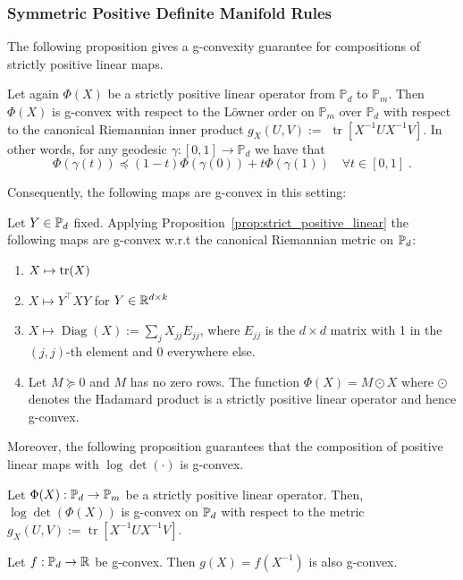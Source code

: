 \documentclass[twoside,11pt]{article}
\begin{document}
\subsubsection{Symmetric Positive Definite Manifold Rules}
The following proposition gives a g-convexity guarantee for compositions of strictly positive linear maps.
%
\begin{prop}\label{prop:strict_positive_linear}
    Let again $\Phi(X)$ be a strictly positive linear operator from $\mathbb{P}_d$ to $\mathbb{P}_m$. Then $\Phi(X)$ is g-convex with respect to the Löwner order on $\mathbb{P}_m$ over $\mathbb{P}_d$ with respect to the canonical Riemannian inner product $g_X(U, V):=$ $\operatorname{tr}\left[X^{-1} U X^{-1} V\right]$. In other words, for any geodesic $\gamma:[0,1] \rightarrow \mathbb{P}_d$ we have that
$$
\Phi(\gamma(t)) \preceq(1-t) \Phi(\gamma(0))+t \Phi(\gamma(1)) \quad \forall t \in[0,1] \; .
$$
\end{prop}
%
Consequently, the following maps are g-convex in this setting:
%
\begin{example}
    Let $Y \in \mathbb{P}_d$ fixed. Applying Proposition~\ref{prop:strict_positive_linear} the following maps are g-convex w.r.t the canonical Riemannian metric on $\mathbb{P}_d$:
    \begin{enumerate}
    \item $X \mapsto \text{tr}(X)$ 
    \item $X \mapsto Y^\top X Y$ for $Y \in \mathbb{R}^{d \times k}$
    \item $X \mapsto \operatorname{Diag}(X) := \sum_{j}X_{jj}E_{jj}$, where $E_{jj}$ is the $d\times d$ matrix with 1 in the $(j,j)$-th element and 0 everywhere else.
    \item Let $M \succeq 0$ and $M$ has no zero rows.  The function $\Phi(X) = M \odot X$ where $\odot$ denotes the Hadamard product is a strictly positive linear operator and hence g-convex.
    \end{enumerate}
\end{example}
%
Moreover, the following proposition guarantees that the composition of positive linear maps with $\log \det(\cdot)$ is g-convex.
%
\begin{prop}\label{prop:logdet_gcvx} Let $\Phi(X):\mathbb{P}_d \to \mathbb{P}_m$ be a strictly positive linear operator. Then, $\log \operatorname{det}(\Phi(X))$ is g-convex on $\mathbb{P}_d$ with respect to the metric $g_X(U, V):=\operatorname{tr}\left[X^{-1} U X^{-1} V\right]$.
\end{prop}
%
\begin{prop}\label{lemma:inverse_gcvx}
    Let $f: \mathbb{P}_d \to \mathbb{R}$ be g-convex.
    Then $g(X) = f(X^{-1})$ is also g-convex.
\end{prop}
\end{document}
